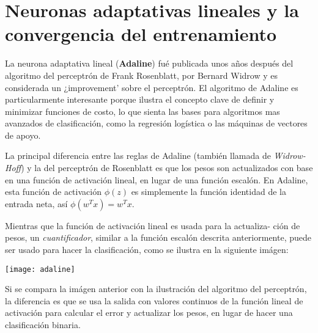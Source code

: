\section{Neuronas adaptativas lineales y la convergencia del entrenamiento}
La neurona adaptativa lineal (\textbf{Adaline}) fué publicada unos años
después del algoritmo del perceptrón de Frank Rosenblatt, por Bernard
Widrow y es considerada un ¿improvement' sobre el perceptrón.
El algoritmo de Adaline es particularmente interesante porque ilustra
el concepto clave de definir y minimizar funciones de costo, lo que
sienta las bases para algoritmos mas avanzados de clasificación,
como la regresión logística o las máquinas de vectores de apoyo.

La principal diferencia entre las reglas de Adaline (también llamada
de \textit{Widrow-Hoff}) y la del perceptrón de Rosenblatt es que los
pesos son actualizados con base en una función de activación lineal,
en lugar de una función escalón. En Adaline, esta función de activación
$\phi (z)$ es simplemente la función identidad de la entrada neta, así
$\phi (w^T x) = w^T x$.

Mientras que la función de activación lineal es usada para la actualiza-
ción de pesos, un \textit{cuantificador}, similar a la función escalón
descrita anteriormente, puede ser usado para hacer la clasificación,
como se ilustra en la siguiente imágen:

\texttt{[image: adaline]}

Si se compara la imágen anterior con la ilustración del algoritmo del
perceptrón, la diferencia es que se usa la salida con valores continuos
de la función lineal de activación para calcular el error y actualizar
los pesos, en lugar de hacer una clasificación binaria.
